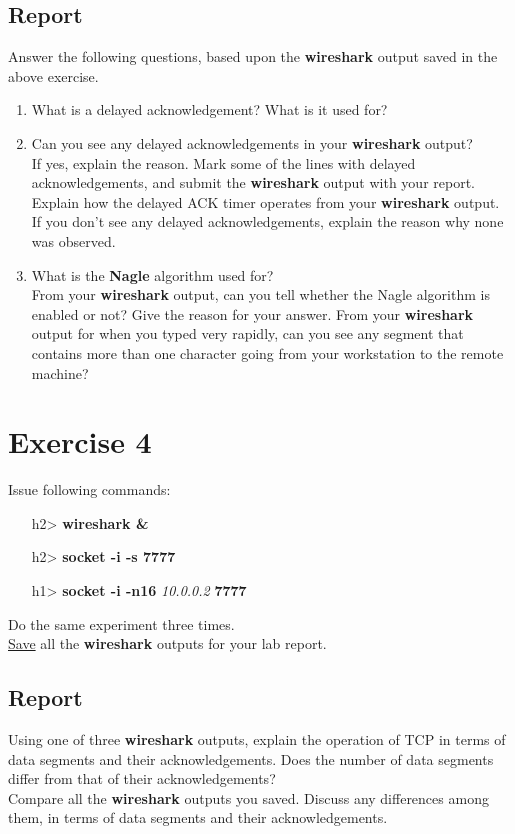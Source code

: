 \documentclass[10pt,a4paper]{article}
\numberwithin{equation}{section}
\numberwithin{figure}{section}
\numberwithin{table}{section}
\begin{document}
    \subsection*{Report}
    Answer the following questions, based upon the \textbf{wireshark} output saved in the above exercise.
    \begin{enumerate}
        \item What is a delayed acknowledgement?
        What is it used for?
        \item Can you see any delayed acknowledgements in your \textbf{wireshark} output? \\
        If yes, explain the reason.
        Mark some of the lines with delayed acknowledgements, and submit the \textbf{wireshark} output with your report. \\
        Explain how the delayed ACK timer operates from your \textbf{wireshark} output. \\
        If you don’t see any delayed acknowledgements, explain the reason why none was observed.
        \item What is the \textbf{Nagle} algorithm used for? \\
        From your \textbf{wireshark} output, can you tell whether the Nagle algorithm is enabled or not?
        Give the reason for your answer.
        From your \textbf{wireshark} output for when you typed very rapidly, can you see any segment that contains more than one character going from your workstation to the remote machine?
    \end{enumerate}

\section*{Exercise 4}
    Issue following commands:
    \begin{itemize}
        \item [h2>] \textbf{wireshark \&}
        \item [h2>] \textbf{socket -i -s 7777}
        \item [h1>] \textbf{socket -i -n16} \textit{10.0.0.2} \textbf{7777}
    \end{itemize}
    Do the same experiment three times. \\
    \underline{Save} all the \textbf{wireshark} outputs for your lab report.
    \subsection*{Report}
    Using one of three \textbf{wireshark} outputs, explain the operation of TCP in terms of data segments and their acknowledgements. Does the number of data segments differ from that of their acknowledgements? \\
    Compare all the \textbf{wireshark} outputs you saved.
    Discuss any differences among them, in terms of data segments and their acknowledgements.
\end{document}
